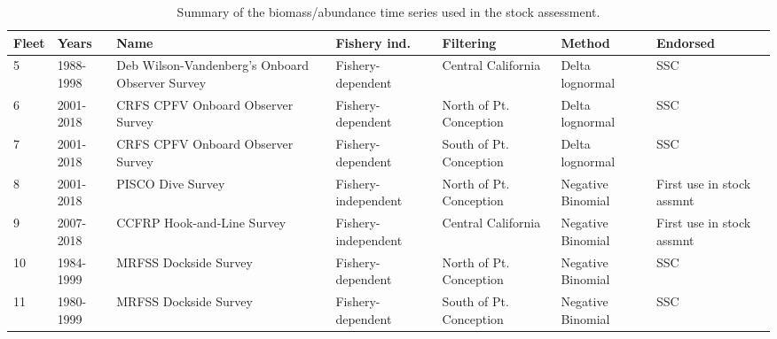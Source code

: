 \documentclass[12pt,]{article}
\begin{document}
\begin{landscape}
\begin{table}[ht]
\centering
\caption{Summary of the biomass/abundance
                                              time series used in the stock
                                              assessment.} 
\label{tab:Index_summary}
\begin{tabular}{>{\raggedright}p{.2in}>{\raggedright}p{1in}>{\raggedright}p{2in}>{\raggedright}p{1.3in}>{\raggedright}p{1in}>{\raggedright}p{1in}>{\raggedright}p{1in}}
  \hline
Fleet & Years & Name & Fishery ind. & Filtering & Method & Endorsed \\ 
  \hline
5 & 1988-1998 & Deb Wilson-Vandenberg's Onboard Observer Survey & Fishery-dependent & Central California & Delta lognormal & SSC \\ 
  6 & 2001-2018 & CRFS CPFV Onboard Observer Survey & Fishery-dependent & North of Pt. Conception & Delta lognormal & SSC \\ 
  7 & 2001-2018 & CRFS CPFV Onboard Observer Survey & Fishery-dependent & South of Pt. Conception & Delta lognormal & SSC \\ 
  8 & 2001-2018 & PISCO Dive Survey & Fishery-independent & North of Pt. Conception & Negative Binomial & First use in stock assmnt \\ 
  9 & 2007-2018 & CCFRP Hook-and-Line Survey & Fishery-independent & Central California & Negative Binomial & First use in stock assmnt \\ 
  10 & 1984-1999 & MRFSS Dockside Survey & Fishery-dependent & North of Pt. Conception & Negative Binomial & SSC \\ 
  11 & 1980-1999 & MRFSS Dockside Survey & Fishery-dependent & South of Pt. Conception & Negative Binomial & SSC \\ 
   \hline
\end{tabular}
\end{table}
\end{landscape}
\end{document}
